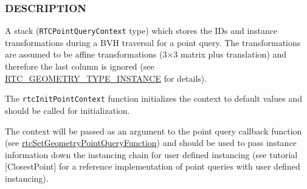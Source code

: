 \begin{Shaded}
\begin{Highlighting}[]

\OperatorTok{(}\OperatorTok{)}
\OperatorTok{\{}
  \OperatorTok{[}\OperatorTok{][}\OperatorTok{];}
  
  \OperatorTok{[}\OperatorTok{][}\OperatorTok{];}

   \OperatorTok{[}\OperatorTok{];}
  
   \OperatorTok{;}
\OperatorTok{\};}

\OperatorTok{(}
  \OperatorTok{*}
\OperatorTok{);}
\end{Highlighting}
\end{Shaded}

\subsubsection{DESCRIPTION}\label{description}

A stack (\texttt{RTCPointQueryContext} type) which stores the IDs and
instance transformations during a BVH traversal for a point query. The
transformations are assumed to be affine transformations (3×3 matrix
plus translation) and therefore the last column is ignored (see
\hyperref[rtc_geometry_type_instance]{RTC\_GEOMETRY\_TYPE\_INSTANCE} for
details).

The \texttt{rtcInitPointContext} function initializes the context to
default values and should be called for initialization.

The context will be passed as an argument to the point query callback
function (see
\hyperref[rtcsetgeometrypointqueryfunction]{rtcSetGeometryPointQueryFunction})
and should be used to pass instance information down the instancing
chain for user defined instancing (see tutorial {[}ClosestPoint{]} for a
reference implementation of point queries with user defined instancing).

